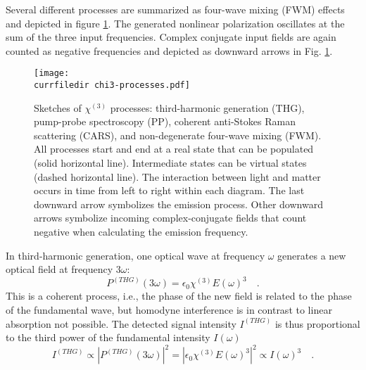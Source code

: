 		
Several different processes are 	summarized as four-wave mixing (FWM) effects and depicted in figure \ref{fig:processes}.  The generated nonlinear polarization oscillates at the sum of the three input frequencies. Complex conjugate input fields are again counted as negative frequencies and depicted as downward arrows in Fig. \ref{fig:processes}.
	
\begin{figure}
\centering\texttt{[image: \\currfiledir  chi3-processes.pdf]}
\caption{Sketches of  $\chi^{(3)}$ processes:
%
third-harmonic generation (THG), pump-probe spectroscopy (PP), coherent anti-Stokes Raman scattering (CARS), and  non-degenerate four-wave mixing (FWM).
%
 All processes start and end at a real state  that can be populated (solid horizontal line). Intermediate states can be virtual states (dashed horizontal line). The interaction between light and matter occurs in time from left to right within each diagram. The last downward arrow symbolizes the emission process. Other downward  arrows symbolize incoming complex-conjugate fields that count negative when calculating the emission frequency.
\label{fig:processes}}
\end{figure}

In third-harmonic generation, one optical wave at frequency $\omega$ generates a new optical field at frequency $3 \omega$: 
%
\begin{equation}
P^{(THG)}(3 \omega) = \epsilon_0 \chi^{(3)} E(\omega)^3  \quad .
\label{eq:chi3-thg}
\end{equation}
%
This is a coherent process, i.e., the phase of the new field is related to the phase of the fundamental wave, but homodyne interference is in contrast to linear absorption not possible. The detected signal intensity $I^{(THG)}$ is thus proportional to the third power of the fundamental intensity $I(\omega)$
\begin{equation}
I^{(THG)} \propto \left| P^{(THG)}(3 \omega) \right|^2 = \left| \epsilon_0 \chi^{(3)} E(\omega)^3 \right|^2 \propto I(\omega)^3 \quad .
\label{eq:intensi-thg}
\end{equation}


